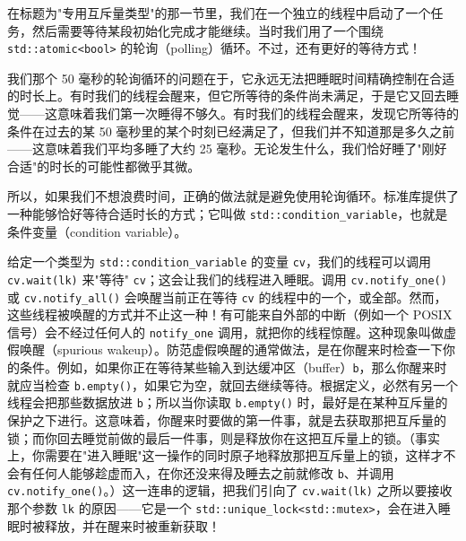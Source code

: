 在标题为"专用互斥量类型"的那一节里，我们在一个独立的线程中启动了一个任务，然后需要等待某段初始化完成才能继续。当时我们用了一个围绕 \texttt{std::\allowbreak{}atomic<\allowbreak{}bool>\allowbreak{}} 的轮询（polling）循环。不过，还有更好的等待方式！

我们那个 50 毫秒的轮询循环的问题在于，它永远无法把睡眠时间精确控制在合适的时长上。有时我们的线程会醒来，但它所等待的条件尚未满足，于是它又回去睡觉——这意味着我们第一次睡得不够久。有时我们的线程会醒来，发现它所等待的条件在过去的某 50 毫秒里的某个时刻已经满足了，但我们并不知道那是多久之前——这意味着我们平均多睡了大约 25 毫秒。无论发生什么，我们恰好睡了"刚好合适"的时长的可能性都微乎其微。

所以，如果我们不想浪费时间，正确的做法就是避免使用轮询循环。标准库提供了一种能够恰好等待合适时长的方式；它叫做 \texttt{std::\allowbreak{}condition\_\allowbreak{}variable}，也就是条件变量（condition variable）。

给定一个类型为 \texttt{std::\allowbreak{}condition\_\allowbreak{}variable} 的变量 \texttt{cv}，我们的线程可以调用 \texttt{cv.\allowbreak{}wait(\allowbreak{}lk)\allowbreak{}} 来"等待" \texttt{cv}；这会让我们的线程进入睡眠。调用 \texttt{cv.\allowbreak{}notify\_\allowbreak{}one(\allowbreak{})\allowbreak{}} 或 \texttt{cv.\allowbreak{}notify\_\allowbreak{}all(\allowbreak{})\allowbreak{}} 会唤醒当前正在等待 \texttt{cv} 的线程中的一个，或全部。然而，这些线程被唤醒的方式并不止这一种！有可能来自外部的中断（例如一个 POSIX 信号）会不经过任何人的 \texttt{notify\_\allowbreak{}one} 调用，就把你的线程惊醒。这种现象叫做虚假唤醒（spurious wakeup）。防范虚假唤醒的通常做法，是在你醒来时检查一下你的条件。例如，如果你正在等待某些输入到达缓冲区（buffer）\texttt{b}，那么你醒来时就应当检查 \texttt{b.\allowbreak{}empty(\allowbreak{})\allowbreak{}}，如果它为空，就回去继续等待。根据定义，必然有另一个线程会把那些数据放进 \texttt{b}；所以当你读取 \texttt{b.\allowbreak{}empty(\allowbreak{})\allowbreak{}} 时，最好是在某种互斥量的保护之下进行。这意味着，你醒来时要做的第一件事，就是去获取那把互斥量的锁；而你回去睡觉前做的最后一件事，则是释放你在这把互斥量上的锁。（事实上，你需要在"进入睡眠"这一操作的同时原子地释放那把互斥量上的锁，这样才不会有任何人能够趁虚而入，在你还没来得及睡去之前就修改 \texttt{b}、并调用 \texttt{cv.\allowbreak{}notify\_\allowbreak{}one(\allowbreak{})\allowbreak{}}。）这一连串的逻辑，把我们引向了 \texttt{cv.\allowbreak{}wait(\allowbreak{}lk)\allowbreak{}} 之所以要接收那个参数 \texttt{lk} 的原因——它是一个 \texttt{std::\allowbreak{}unique\_\allowbreak{}lock<\allowbreak{}std::\allowbreak{}mutex>\allowbreak{}}，会在进入睡眠时被释放，并在醒来时被重新获取！

